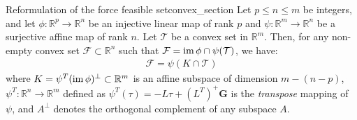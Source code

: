 \begin{theorembox}{Reformulation of the force feasible set}{convex_section}
Let $p \leq n \leq m$ be integers, and let $\phi: \mathbb{R}^p \rightarrow \mathbb{R}^n$ be an injective linear map of rank $p$ and $\psi: \mathbb{R}^m \rightarrow \mathbb{R}^n$ be a surjective affine map of rank $n$. Let $\mathcal{T}$ be a convex set in $\mathbb{R}^m$. Then, for any non-empty convex set $\mathcal{F} \subset \mathbb{R}^n$ such that $\mathcal{F} = \operatorname{im} \phi \cap \psi(\mathcal{T})$, we have:
\begin{align*}
    \mathcal{F} = \psi(K \cap \mathcal{T})
\end{align*}
where $K = \psi^T(\operatorname{im} \phi)^\perp \subset \mathbb{R}^m$ is an affine subspace of dimension $m-(n-p)$, $\psi^T: \mathbb{R}^n \rightarrow \mathbb{R}^m$ defined as $\psi^T(\tau) = -L\tau + (L^T)^+\mathbf{G}$ is the \emph{transpose} mapping of $\psi$, and $A^\perp$ denotes the orthogonal complement of any subspace $A$. 
\end{theorembox}
